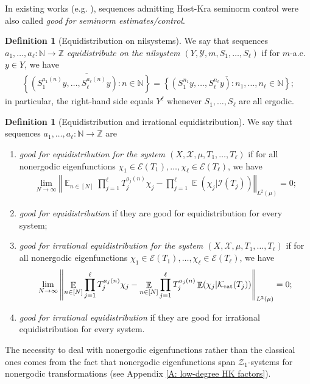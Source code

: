 \documentclass[11pt]{amsart}
\theoremstyle{definition}
\newtheorem{definition}[lemma]{Definition}
\DeclareMathOperator*{\E}{\mathbb{E}}
\newcommand{\N}{{\mathbb N}}
\newcommand{\Z}{{\mathbb Z}}
\newcommand{\CE}{{\mathcal E}}
\newcommand{\CI}{{\mathcal I}}
\newcommand{\CK}{{\mathcal K}}
\newcommand{\CX}{{\mathcal X}}
\newcommand{\CY}{{\mathcal Y}}
\newcommand{\CZ}{{\mathcal Z}}
\newcommand{\norm}[1]{\left\Vert #1\right\Vert}
\newcommand{\1}{{\mathbf{1}}}
\newcommand{\Krat}{{\CK_{\text{\rm rat}}}}
\newcommand{\rem}[1]{\left \{ #1 \right \}}
\begin{document}
In existing works (e.g. \cite{Fr21, FrKu22a}), sequences admitting Host-Kra seminorm control were also called \emph{good for seminorm estimates/control}.

\begin{definition}[Equidistribution on nilsystems]
We say that sequences $a_1,\ldots,a_\ell\colon \N\to \Z$ \emph{equidistribute on the nilsystem $(Y, \CY, m, S_1, \ldots, S_\ell)$} if for $m$-a.e. $y\in Y$, we have 
    \begin{align*}
        \overline{\rem{(S_1^{a_1(n)}y, \ldots, S_\ell^{a_\ell(n)}y)\colon n\in\N}} = \overline{\rem{(S_1^{n_1} y, \ldots, S_\ell^{n_\ell}y)\colon n_1, \ldots, n_\ell\in\N}};
    \end{align*}
    in particular, the right-hand side equals $Y^\ell$ whenever $S_1, \ldots, S_\ell$ are all ergodic.
\end{definition}

\begin{definition}[Equidistribution and irrational equidistribution]\label{D: equidistribution}
We say that sequences $a_1,\ldots,a_\ell\colon \N\to \Z$ are
    \begin{enumerate}
        \item\label{i:local-rational}    {\em good for equidistribution   for the  system $(X, \CX, \mu,T_1,\ldots, T_\ell)$} if for all nonergodic eigenfunctions $\chi_1\in \CE(T_1), \ldots, \chi_\ell\in\CE(T_\ell)$, we have
    \begin{align*}
        \lim_{N\to\infty}\norm{\E_{n\in[N]} \prod_{j=1}^\ell T_j^{a_j(n)}\chi_j-\prod_{j=1}^\ell\E(\chi_j|\CI(T_j))}_{L^2(\mu)} = 0;
    \end{align*}
    \item \emph{good for equidistribution} if they are good for equidistribution for every system;
    \item\label{i:local-irrational}  {\em good for  irrational equidistribution   for the  system $(X, \CX, \mu,T_1,\ldots, T_\ell)$} if for all nonergodic eigenfunctions $\chi_1\in \CE(T_1), \ldots, \chi_\ell\in\CE(T_\ell)$, we have
    \begin{align}\label{E: Krat identity}
        \lim_{N\to\infty}\norm{\E_{n\in[N]} \prod_{j=1}^\ell T_j^{a_j(n)}\chi_j-\E_{n\in[N]} \prod_{j=1}^\ell T_j^{a_j(n)}\E(\chi_j|\Krat(T_j))}_{L^2(\mu)} = 0;
    \end{align}
    \item \emph{good for irrational equidistribution} if they are good for irrational equidistribution for every system.
    \end{enumerate}
\end{definition}
The necessity to deal with nonergodic eigenfunctions rather than the classical ones comes from the fact that nonergodic eigenfunctions span $\CZ_1$-systems for nonergodic transformations (see Appendix \ref{A: low-degree HK factors}).
\end{document}
